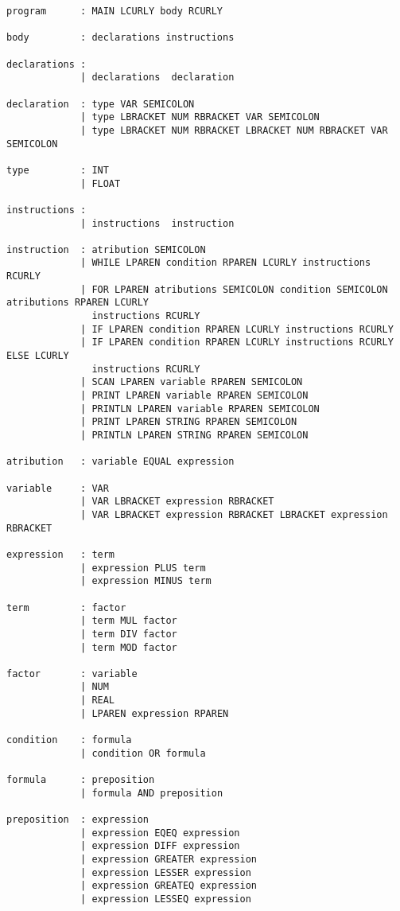 \documentclass[11pt,a4paper]{report}%
\begin{document}
\begin{verbatim}
program      : MAIN LCURLY body RCURLY

body         : declarations instructions

declarations : 
             | declarations  declaration

declaration  : type VAR SEMICOLON
             | type LBRACKET NUM RBRACKET VAR SEMICOLON
             | type LBRACKET NUM RBRACKET LBRACKET NUM RBRACKET VAR SEMICOLON

type         : INT
             | FLOAT

instructions :
             | instructions  instruction

instruction  : atribution SEMICOLON
             | WHILE LPAREN condition RPAREN LCURLY instructions RCURLY
             | FOR LPAREN atributions SEMICOLON condition SEMICOLON atributions RPAREN LCURLY 
               instructions RCURLY
             | IF LPAREN condition RPAREN LCURLY instructions RCURLY
             | IF LPAREN condition RPAREN LCURLY instructions RCURLY ELSE LCURLY 
               instructions RCURLY
             | SCAN LPAREN variable RPAREN SEMICOLON
             | PRINT LPAREN variable RPAREN SEMICOLON
             | PRINTLN LPAREN variable RPAREN SEMICOLON
             | PRINT LPAREN STRING RPAREN SEMICOLON
             | PRINTLN LPAREN STRING RPAREN SEMICOLON

atribution   : variable EQUAL expression 

variable     : VAR
             | VAR LBRACKET expression RBRACKET
             | VAR LBRACKET expression RBRACKET LBRACKET expression RBRACKET

expression   : term
             | expression PLUS term
             | expression MINUS term
             
term         : factor
             | term MUL factor
             | term DIV factor
             | term MOD factor

factor       : variable
             | NUM
             | REAL
             | LPAREN expression RPAREN

condition    : formula
             | condition OR formula

formula      : preposition
             | formula AND preposition

preposition  : expression
             | expression EQEQ expression
             | expression DIFF expression
             | expression GREATER expression
             | expression LESSER expression
             | expression GREATEQ expression
             | expression LESSEQ expression
\end{verbatim}
\end{document}
